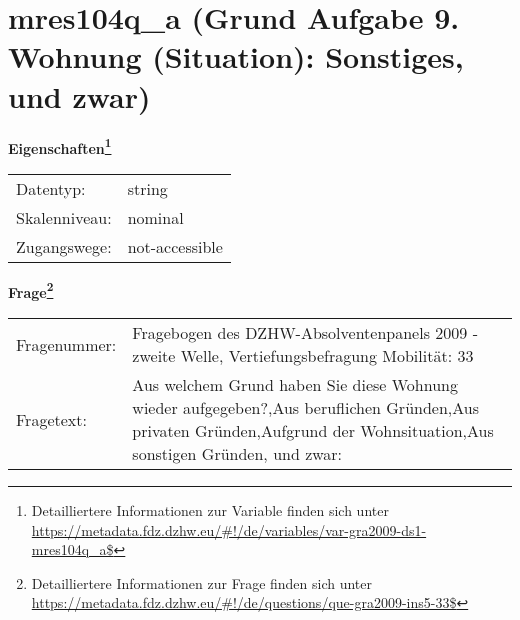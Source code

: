 
    \setcounter{footnote}{0}

    \vspace*{-1.8cm}
	\section{mres104q\_a (Grund Aufgabe 9. Wohnung (Situation): Sonstiges, und zwar)}
	\label{section:mres104q_a}



    \vspace*{0.5cm}
    \noindent\textbf{Eigenschaften\footnote{Detailliertere Informationen zur Variable finden sich unter
		\url{https://metadata.fdz.dzhw.eu/\#!/de/variables/var-gra2009-ds1-mres104q_a$}}}\\
	\begin{tabularx}{\hsize}{@{}lX}
	Datentyp: & string \\
	Skalenniveau: & nominal \\
	Zugangswege: &
	  not-accessible
 \\
    \end{tabularx}



				\vspace*{0.5cm}
                \noindent\textbf{Frage\footnote{Detailliertere Informationen zur Frage finden sich unter
		              \url{https://metadata.fdz.dzhw.eu/\#!/de/questions/que-gra2009-ins5-33$}}}\\
				\begin{tabularx}{\hsize}{@{}lX}
					Fragenummer: &
					  Fragebogen des DZHW-Absolventenpanels 2009 - zweite Welle, Vertiefungsbefragung Mobilität:
					  33
 \\
					Fragetext: & Aus welchem Grund haben Sie diese Wohnung wieder aufgegeben?,Aus beruflichen Gründen,Aus privaten Gründen,Aufgrund der Wohnsituation,Aus sonstigen Gründen, und zwar: \\
				\end{tabularx}




